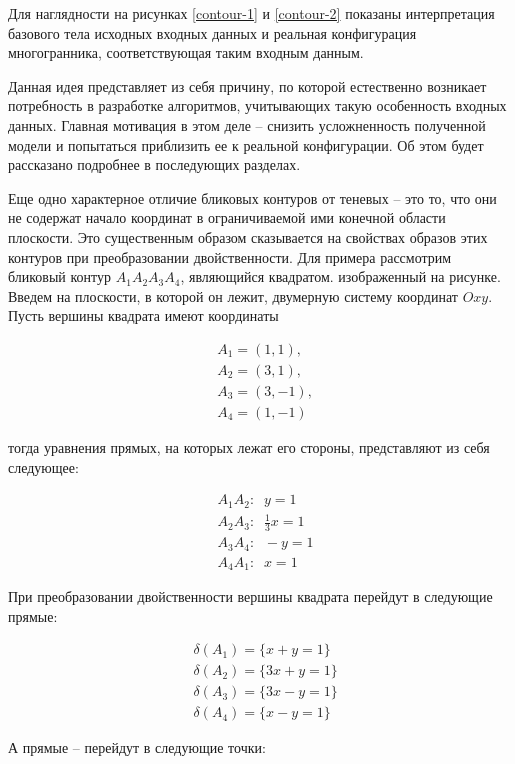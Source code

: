 \documentclass[a4paper, 12pt, titlepage]{article}
\theoremstyle{definition}
\theoremstyle{plain}
\theoremstyle{plain}
\begin{document}
Для наглядности на рисунках \ref{contour-1} и \ref{contour-2} показаны
интерпретация базового тела исходных входных данных и реальная конфигурация
многогранника, соответствующая таким входным данным.

Данная идея представляет из себя причину, по которой естественно возникает
потребность в разработке алгоритмов, учитывающих такую особенность входных
данных. Главная мотивация в этом деле -- снизить усложненность полученной
модели и попытаться приблизить ее к реальной конфигурации. Об этом будет
рассказано подробнее в последующих разделах.

Еще одно характерное отличие бликовых контуров от теневых -- это то, что они не
содержат начало координат в ограничиваемой ими конечной области плоскости. Это
существенным образом сказывается на свойствах образов этих контуров при
преобразовании двойственности. Для примера рассмотрим бликовый контур
$A_{1}A_{2}A_{3}A_{4}$, являющийся квадратом. изображенный на рисунке.
Введем на плоскости, в которой он лежит, двумерную систему координат $Oxy$.
Пусть вершины квадрата имеют координаты

\begin{align*}
& A_{1} = (1, 1), \\
& A_{2} = (3, 1), \\
& A_{3} = (3, -1), \\
& A_{4} = (1, -1) 
\end{align*}

тогда уравнения прямых, на которых лежат его стороны, представляют из себя
следующее:

\begin{align*}
& A_{1} A_{2}: \;\; y = 1 \\
& A_{2} A_{3}: \;\; \frac{1}{3} x = 1 \\
& A_{3} A_{4}: \;\; -y = 1 \\
& A_{4} A_{1}: \;\; x = 1
\end{align*}

При преобразовании двойственности вершины квадрата перейдут в следующие прямые:

\begin{align*}
& \delta(A_{1}) = \{ x + y = 1 \} \\
& \delta(A_{2}) = \{ 3 x + y = 1 \} \\
& \delta(A_{3}) = \{ 3 x - y = 1 \} \\
& \delta(A_{4}) = \{ x - y = 1 \}
\end{align*}

А прямые -- перейдут в следующие точки:
\end{document}
